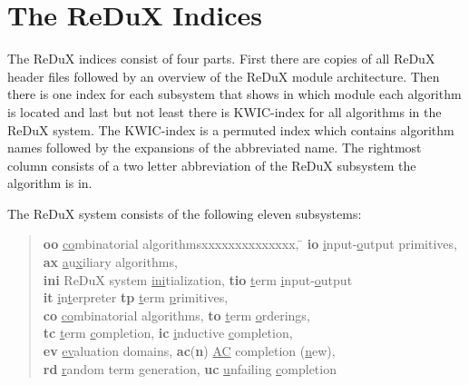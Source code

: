 \section{The ReDuX Indices}

The ReDuX indices consist of four parts. 
First there are copies of all ReDuX header files
followed by an overview of the ReDuX module architecture.
Then there is one index for each subsystem
that shows in which module each algorithm is located and last but not least
there is KWIC-index for all algorithms in the ReDuX system.
The KWIC-index is a permuted index which contains algorithm names followed 
by the expansions of the abbreviated name.
The rightmost column consists of a two letter abbreviation of the ReDuX
subsystem the algorithm is in.


The ReDuX system consists of the following eleven subsystems:
\begin{quote}
\begin{tabbing}
 {\bf oo} \underline{co}mbinatorial algorithmsxxxxxxxxxxxxxx, \= \kill
 {\bf io} \underline{i}nput-\underline{o}utput primitives, \>
 {\bf ax} \underline{a}u\underline{x}iliary algorithms, \\
 {\bf ini} ReDuX system \underline{ini}tialization, \>
 {\bf tio} \underline{t}erm \underline{i}nput-\underline{o}utput \\
 {\bf it} \underline{i}n\underline{t}erpreter \>
 {\bf tp} \underline{t}erm \underline{p}rimitives, \\
 {\bf co} \underline{co}mbinatorial algorithms, \>
 {\bf to} \underline{t}erm \underline{o}rderings, \\
 {\bf tc} \underline{t}erm \underline{c}ompletion, \>
 {\bf ic} \underline{i}nductive \underline{c}ompletion, \\
 {\bf ev} \underline{ev}aluation domains, \>
 {\bf ac}({\bf n}) \underline{AC} completion (\underline{n}ew), \\
 {\bf rd} \underline{r}andom term generation, \>
 {\bf uc} \underline{u}nfailing \underline{c}ompletion \\
\end{tabbing}
\end{quote}
